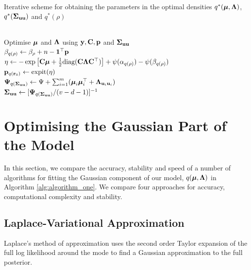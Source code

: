 \documentclass{amsart}[12pt]
\begin{document}
\begin{algorithm}
	\caption[Algorithm 1]{Iterative scheme for obtaining the parameters in the
		optimal densities $q^*({\boldsymbol \mu}, {\boldsymbol \Lambda})$, $q^*({\boldsymbol \Sigma}_{{\bf u} {\bf u}})$ and $q^*(\rho)$}
	\label{alg:algorithm_one}
	\begin{algorithmic}
		 \\[1ex]
		\STATE Optimise ${\boldsymbol \mu}$ and ${\boldsymbol \Lambda}$ using ${\bf y}, {\bf C}, {\bf p}$ and ${\boldsymbol \Sigma}_{{\bf u} {\bf u}}$ \\[1ex]
		\STATE $\beta_{q(\rho)} \leftarrow \beta_\rho + n - {\bf 1}^\top{\bf p}$ \\[1ex]
		\STATE $\eta \leftarrow -\exp \left [ {\bf C} {\boldsymbol \mu} + \tfrac{1}{2} \text{diag}{({\bf C}{\boldsymbol\Lambda}{\bf C}^\top)} \right ] + \psi{(\alpha_{q{(\rho)}})} - \psi{(\beta_{q{(\rho)}})}$ \\[1ex]
			\STATE ${\bf p}_{q({\bf r}_0)} \leftarrow \text{expit} (\eta)$ \\[1ex]
			\STATE ${\boldsymbol \Psi}_{q({\boldsymbol \Sigma}_{{\bf u} {\bf u}})} \leftarrow \Psi + \sum_{i=1}^m ({\boldsymbol \mu}_i {\boldsymbol \mu}_i^\top + {\boldsymbol \Lambda}_{{{\bf u}}_i {{\bf u}}_i})$ \\[1ex]
			\STATE ${\boldsymbol \Sigma}_{{\bf u}{\bf u}} \leftarrow [{\boldsymbol \Psi}_{q({\boldsymbol \Sigma}_{{\bf u} {\bf u}})}/(v - d - 1)]^{-1}$
			\ENDWHILE
		\end{algorithmic}
	\end{algorithm}
			
	\section{Optimising the Gaussian Part of the Model}
	\label{sec:gaussian}
		
	In this section, we compare the accuracy, stability and speed of a number of algorithms for fitting the
	Gaussian component of our model, $q({\boldsymbol \mu}, {\boldsymbol \Lambda})$ in Algorithm \ref{alg:algorithm_one}.  We compare four
	approaches for accuracy, computational complexity and stability.
	
	\subsection{Laplace-Variational Approximation}
		
	Laplace's method of approximation uses the second order Taylor expansion of the full log likelihood around
	the mode to find a Gaussian approximation to the full posterior.
	
\end{document}
